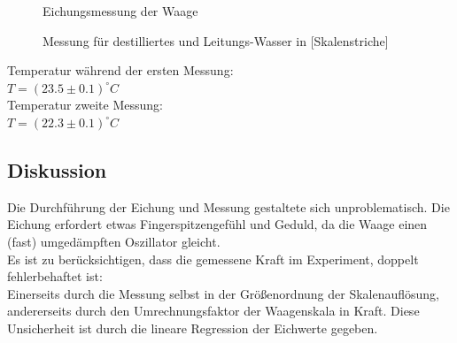 \documentclass[12pt,a4paper]{article}
\begin{document}
\begin{multicols}{2}


\begin{figure}[H]
	\centering
	\caption{Eichungsmessung der Waage}
	\label{fig:oberflaeche_eichung}
\end{figure}
\noindent

\begin{figure}[H]
	\centering
	\caption{Messung für destilliertes und Leitungs-Wasser in [Skalenstriche]}
	\label{fig:oberflaeche_messung}
\end{figure}

\noindent
Temperatur während der ersten Messung:\\
$T=(23.5 \pm 0.1)^{\circ}C$\\
Temperatur zweite Messung:\\
$T=(22.3 \pm 0.1)^{\circ}C$\\

\subsection{Diskussion}
Die Durchführung der Eichung und Messung gestaltete sich unproblematisch. Die Eichung erfordert etwas Fingerspitzengefühl und Geduld, da die Waage einen (fast) umgedämpften Oszillator gleicht.\\
Es ist zu berücksichtigen, dass die gemessene Kraft im Experiment, doppelt fehlerbehaftet ist:\\
Einerseits durch die Messung selbst in der Größenordnung der Skalenauflösung, andererseits durch den Umrechnungsfaktor der Waagenskala in Kraft. Diese Unsicherheit ist durch die lineare Regression der Eichwerte gegeben.\\



\end{multicols}
\end{document}
